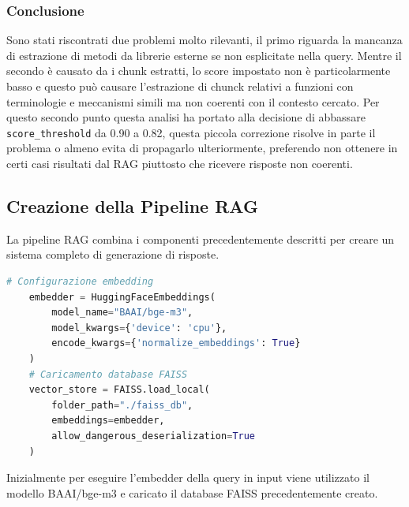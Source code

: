 \documentclass[12pt,a4paper,openright,twoside]{book}
\begin{document}
    \subsubsection{Conclusione}
    Sono stati riscontrati due problemi molto rilevanti, il primo riguarda la mancanza di estrazione di metodi da librerie esterne se non esplicitate nella query.
    Mentre il secondo è causato da i chunk estratti, lo score impostato non è particolarmente basso e questo può causare l'estrazione di chunck relativi a funzioni con terminologie e meccanismi simili ma non coerenti con il contesto cercato.
    Per questo secondo punto questa analisi ha portato alla decisione di abbassare \texttt{score\_threshold} da 0.90 a 0.82,
    questa piccola correzione risolve in parte il problema o almeno evita di propagarlo ulteriormente, preferendo non ottenere in certi casi risultati dal \ac{RAG} piuttosto che ricevere risposte non coerenti.
\subsection{Creazione della Pipeline RAG}
La pipeline RAG combina i componenti precedentemente descritti per creare un sistema completo di generazione di risposte.
\begin{lstlisting}[language=Python, caption={Caricamento database FAISS}, label={lst:Caricamento database FAISS}]
    # Configurazione embedding
    embedder = HuggingFaceEmbeddings(
        model_name="BAAI/bge-m3",
        model_kwargs={'device': 'cpu'},
        encode_kwargs={'normalize_embeddings': True}
    )
    # Caricamento database FAISS
    vector_store = FAISS.load_local(
        folder_path="./faiss_db",
        embeddings=embedder,
        allow_dangerous_deserialization=True
    )
\end{lstlisting}
Inizialmente per eseguire l'embedder della query in input viene utilizzato il modello BAAI/bge-m3 e caricato il database FAISS precedentemente creato.
\end{document}
